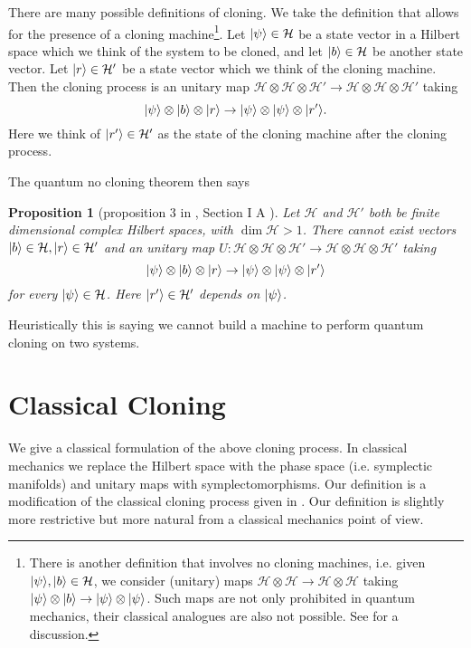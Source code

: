 \documentclass[jmp,amsmath,amssymb]{revtex4-1}
\theoremstyle{plain}
\newtheorem{proposition}[theorem]{Proposition}
\DeclarePairedDelimiter\ket{\lvert}{\rangle}
\begin{document}
There are many possible definitions of cloning. We take the definition that allows for the presence of a cloning machine\footnote{There is another definition that involves no cloning machines, i.e. given $\ket{\psi}, \ket{b} \in \mathcal{H}$, we consider (unitary) maps $\mathcal{H}\otimes \mathcal{H} \rightarrow \mathcal{H} \otimes \mathcal{H}$ taking $\ket{\psi}\otimes \ket{b} \rightarrow \ket{\psi} \otimes \ket{\psi}$. Such maps are not only prohibited in quantum mechanics, their classical analogues are also not possible. See \cite{fenyes_2010,fenyes} for a discussion.}. Let $\ket{\psi} \in \mathcal{H}$ be a state vector in a Hilbert space which we think of the system to be cloned, and let $\ket{b} \in \mathcal{H}$ be another state vector. Let $\ket{r} \in \mathcal{H}'$ be a state vector which we think of the cloning machine. Then the cloning process is an unitary map $\mathcal{H} \otimes \mathcal {H} \otimes \mathcal{H}' \rightarrow \mathcal{H} \otimes \mathcal {H} \otimes \mathcal{H}'$ taking
\[
\ket{\psi} \otimes \ket{b} \otimes \ket{r} \rightarrow \ket{\psi} \otimes \ket{\psi} \otimes \ket{r'}.
\]
Here we think of $\ket{r'}\in \mathcal{H}'$ as the state of the cloning machine after the cloning process. 

The quantum no cloning theorem then says
\begin{proposition}[proposition 3 in \cite{fenyes}, Section I A \cite{RevModPhys.77.1225}]
Let $\mathcal{H}$ and $\mathcal{H}'$ both be finite dimensional complex Hilbert spaces, with $\dim \mathcal{H} >1$. There cannot exist vectors $\ket{b} \in \mathcal{H}, \ket{r} \in \mathcal{H}'$ and an unitary map $U: \mathcal{H} \otimes \mathcal{H} \otimes \mathcal{H}'\rightarrow \mathcal{H} \otimes \mathcal{H} \otimes \mathcal{H}'$ taking
\[
\ket{\psi} \otimes \ket{b} \otimes \ket{r} \rightarrow \ket{\psi} \otimes \ket{\psi} \otimes \ket{r'}
\]
for every $\ket{\psi} \in \mathcal{H}$. Here $\ket{r'} \in \mathcal{H}'$ depends on $\ket{\psi}$.
\end{proposition}
Heuristically this is saying we cannot build a machine to perform quantum cloning on two systems. 

\section{Classical Cloning} \label{sec:classical_cloning}
We give a classical formulation of the above cloning process. In classical mechanics we replace the Hilbert space with the phase space (i.e. symplectic manifolds) and unitary maps with symplectomorphisms. Our definition is a modification of the classical cloning process given in \cite[Definition 4]{fenyes}. Our definition is slightly more restrictive but more natural from a classical mechanics point of view. 
\end{document}
